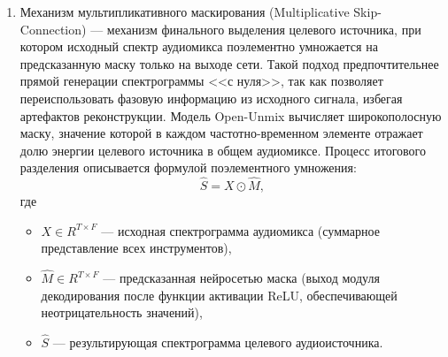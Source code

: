 \documentclass[14pt]{extarticle}
\begin{document}
\begin{enumerate}[label=\arabic*)]
Архитектурно декодировщик зеркален кодировщику и включает:
    \begin{itemize}[label=$\bullet$, wide]
		\item Два полносвязных слоя (fc2 и fc3) --- слой fc2 проецирует объединённый вектор признаков из расширенного 
		пространства обратно в компактное представление, а слой fc3 расширяет его до исходного числа частотно-канальных коэффициентов, 
		формируя основу для последующего вычисления весовой маски.
        \item Два слоя пакетной нормализации (bn2 и bn3) --- стабилизируют распределение сигналов внутри пакета на промежуточных
		этапах восстановления.
        \item Функцию активации ReLU --- функция применяется после нормализации и на финальном выходе блока декодировщика.
		Формально функция определяется следующим образом:
			\begin{equation*}
				\label{eq:relu}
				\operatorname{ReLU}(x) = 
				\begin{cases} 
					0, & \text{если } x < 0, \\
					x, & \text{если } x \geq 0,
				\end{cases}
			\end{equation*}
	\end{itemize}
		Фунция ReLU заменяет все отрицательные значения нулями. 
		Это обеспечивает два важных свойства: во-первых, модель фокусируется только на значимых признаках, подавляя фоновый шум; 
		во-вторых, гарантируется неотрицательность итоговой маски, что соответствует физической природе амплитудного спектра, 
		потому что интенсивность частотных компонент не может принимать отрицательные значения.

\item Механизм мультипликативного маскирования (Multiplicative Skip-Connection) --- механизм финального выделения 
целевого источника, при котором исходный спектр аудиомикса поэлементно умножается на предсказанную 
маску только на выходе сети.
Такой подход предпочтительнее прямой генерации спектрограммы <<с нуля>>, так как позволяет переиспользовать фазовую информацию из 
исходного сигнала, избегая артефактов реконструкции. 
Модель Open-Unmix вычисляет широкополосную маску, значение которой в каждом частотно-временном элементе
 отражает долю энергии целевого источника в общем аудиомиксе. Процесс итогового разделения описывается формулой поэлементного умножения:
\begin{equation*}
    \hat{S} = X \odot \hat{M},
\end{equation*}
где 
\begin{itemize}[label=$\bullet$, wide]
	\item $X \in {R}^{T \times F}$ --- исходная спектрограмма аудиомикса (суммарное представление всех инструментов),
	\item $\hat{M} \in {R}^{T \times F}$ --- предсказанная нейросетью маска (выход модуля декодирования после функции активации
	 ReLU, обеспечивающей неотрицательность значений),
	\item $\hat{S}$ --- результирующая спектрограмма целевого аудиоисточника.
\end{itemize}
\end{enumerate}
\end{document}
